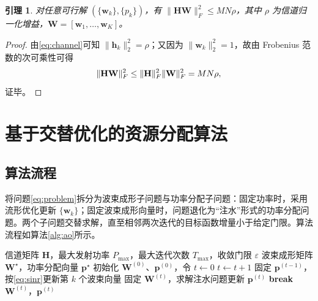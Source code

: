 \documentclass[UTF8, a4paper, zihao=-4, fontset=windows, twocolumn]{ctexart}
\theoremstyle{plain}
\newtheorem{lemma}{引理}
\theoremstyle{definition}
\theoremstyle{plain}
\begin{document}
\begin{lemma}\label{lem:bound}
对任意可行解 $\left(\{\mathbf{w}_k\},\{p_k\}\right)$，有 $\|\mathbf{H}\mathbf{W}\|_F^2\le MN\rho$，其中 $\rho$ 为信道归一化增益，$\mathbf{W}=[\mathbf{w}_1,\ldots,\mathbf{w}_K]$。
\end{lemma}

\begin{proof}
由\eqref{eq:channel}可知 $\|\mathbf{h}_k\|_2^2=\rho$；又因为 $\|\mathbf{w}_k\|_2^2=1$，故由 Frobenius 范数的次可乘性可得
\begin{equation}
\|\mathbf{H}\mathbf{W}\|_F^2\le\|\mathbf{H}\|_F^2\|\mathbf{W}\|_F^2=MN\rho,
\notag
\end{equation}
证毕。
\end{proof}

\section{基于交替优化的资源分配算法}\label{sec:algo}

\subsection{算法流程}\label{sec:flow}

将问题\eqref{eq:problem}拆分为波束成形子问题与功率分配子问题：固定功率时，采用流形优化更新 $\{\mathbf{w}_k\}$；固定波束成形向量时，问题退化为“注水”形式的功率分配问题。两个子问题交替求解，直至相邻两次迭代的目标函数增量小于给定门限。算法流程如算法\ref{alg:ao}所示。

\begin{algorithm}[htbp]
\caption{基于交替优化的联合资源分配算法}\label{alg:ao}
\begin{algorithmic}[1]
\Require 信道矩阵 $\mathbf{H}$，最大发射功率 $P_{\max}$，最大迭代次数 $T_{\max}$，收敛门限 $\varepsilon$
\Ensure 波束成形矩阵 $\mathbf{W}^{\star}$，功率分配向量 $\mathbf{p}^{\star}$
\State 初始化 $\mathbf{W}^{(0)}$、$\mathbf{p}^{(0)}$，令 $t\leftarrow 0$
  \State $t\leftarrow t+1$
    \State 固定 $\mathbf{p}^{(t-1)}$，按\eqref{eq:sinr}更新第 $k$ 个波束向量 
  \EndFor
  \State 固定 $\mathbf{W}^{(t)}$，求解注水问题更新 $\mathbf{p}^{(t)}$ 
    \State \textbf{break} 
  \EndIf
\EndWhile
\State \Return $\mathbf{W}^{(t)}$，$\mathbf{p}^{(t)}$
\end{algorithmic}
\end{algorithm}
\end{document}
